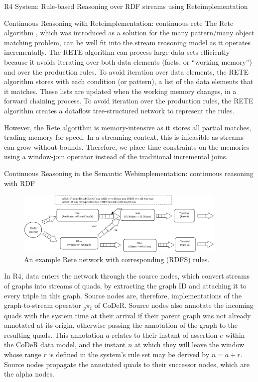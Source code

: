 \begin{nestedsection}{R4 System: Rule-based Reasoning over RDF streams using Rete}{implementation}
	\begin{nestedsection}{Continuous Reasoning with Rete}{implementation: continuous rete}
		The Rete algorithm \citep{forgy79}, which was introduced as a solution for the many pattern/many object matching problem, can be well fit into the stream reasoning model as it operates incrementally.
		The RETE algorithm can process large data sets efficiently because it avoids iterating over both data elements (facts, or ``working memory'') and over the production rules.
		To avoid iteration over data elements, the RETE algorithm stores with each condition (or pattern), a list of the data elements that it matches.
		These lists are updated when the working memory changes, in a forward chaining process.
		To avoid iteration over the production rules, the RETE algorithm creates a dataflow tree-structured network to represent the rules.

		However, the Rete algorithm is memory-intensive as it stores all partial matches, trading memory for speed.
		In a streaming context, this is infeasible as streams can grow without bounds.
		Therefore, we place time constraints on the memories using a window-join operator instead of the traditional incremental joins.
	\end{nestedsection}
	\begin{nestedsection}{Continuous Reasoning in the Semantic Web}{implementation: continuous reasoning with RDF}
		\begin{figure}[t]
 			\centering
 			\includegraphics[width=0.9\textwidth]{example-rete-network.png}
 			\caption{An example Rete network with corresponding (RDFS) rules.}
 		\end{figure}
		In R4, data enters the network through the source nodes, which convert streams of graphs into streams of quads, by extracting the graph ID and attaching it to every triple in this graph.
		Source nodes are, therefore, implementations of the graph-to-stream operator ${{}_g{\pi_t}}$ of CoDeR.
		Source nodes also annotate the incoming quads with the system time at their arrival if their parent graph was not already annotated at its origin, otherwise passing the annotation of the graph to the resulting quads.
		This annotation $a$ relates to their instant of assertion $e$ within the CoDeR data model, and the instant $n$ at which they will leave the window whose range $r$ is defined in the system's rule set may be derived by ${n = a + r}$.
		Source nodes propagate the annotated quads to their successor nodes, which are the alpha nodes.


\end{nestedsection}
\end{nestedsection}
